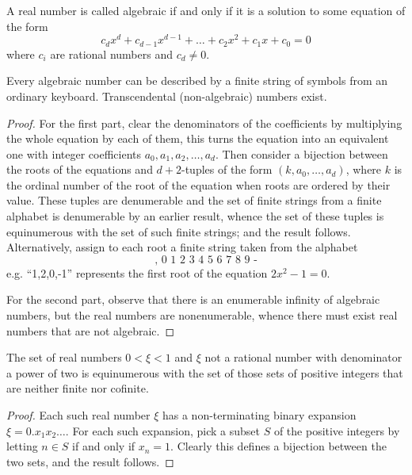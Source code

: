\begin{exercise}[2.6]
  A real number is called algebraic if and only if it is a solution to some equation of the form
  \begin{equation*}
    c_dx^d + c_{d-1}x^{d-1} + \ldots + c_2x^2 + c_1x + c_0 = 0
  \end{equation*}
  where $c_i$ are rational numbers and $c_d \ne 0$.

  Every algebraic number can be described by a finite string of symbols from an ordinary keyboard.
  Transcendental (non-algebraic) numbers exist.
\end{exercise}
\begin{proof}
  For the first part, clear the denominators of the coefficients by multiplying the whole equation by each of them, this turns the equation into an equivalent one with integer coefficients $a_0, a_1, a_2, \ldots, a_d$.
  Then consider a bijection between the roots of the equations and $d+2$-tuples of the form $(k, a_0, \ldots, a_d)$, where $k$ is the ordinal number of the root of the equation when roots are ordered by their value.
  These tuples are denumerable and the set of finite strings from a finite alphabet is denumerable by an earlier result, whence the set of these tuples is equinumerous with the set of such finite strings; and the result follows.
  Alternatively, assign to each root a finite string taken from the alphabet
  \begin{equation*}
    \text{, 0 1 2 3 4 5 6 7 8 9 -}
  \end{equation*}
  e.g. ``1,2,0,-1'' represents the first root of the equation $2x^2-1 = 0$.

  For the second part, observe that there is an enumerable infinity of algebraic numbers, but the real numbers are nonenumerable, whence there must exist real numbers that are not algebraic.
\end{proof}

\begin{exercise}[2.7]
  The set of real numbers $0 < \xi < 1$ and $\xi$ not a rational number with denominator a power of two is equinumerous with the set of those sets of positive integers that are neither finite nor cofinite.
\end{exercise}
\begin{proof}
  Each such real number $\xi$ has a non-terminating binary expansion $\xi = 0.x_1x_2\ldots$.
  For each such expansion, pick a subset $S$ of the positive integers by letting $n \in S$ if and only if $x_n = 1$.
  Clearly this defines a bijection between the two sets, and the result follows.
\end{proof}


